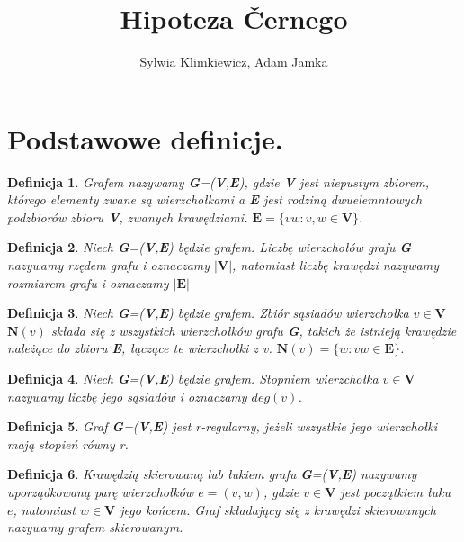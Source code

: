 \documentclass[12pt,a4paper]{article}
\newtheorem{df}{Definicja}[section]
\begin{document}
\title{Hipoteza \v Cernego}
\author{Sylwia Klimkiewicz, Adam Jamka}
\maketitle


\section{Podstawowe definicje.}
\begin{df} 
Grafem nazywamy \textbf{G}=(\textbf{V},\textbf{E}), gdzie \textbf{V} jest niepustym zbiorem, kt\'orego elementy zwane s\k{a} wierzcho{\l}kami a \textbf{E} jest rodzin\k{a} dwuelemntowych podzbior\'ow zbioru \textbf{V}, zwanych kraw\k{e}dziami.
$\textbf{E}=\{vw : v,w\in\textbf{V}\}$.
\end{df}
\begin{df} 
Niech \textbf{G}=(\textbf{V},\textbf{E}) b\k{e}dzie grafem. Liczb\k{e} wierzcho{\l}\'ow grafu \textbf{G} nazywamy rz\k{e}dem grafu i oznaczamy $|\textbf{V}|$, natomiast liczb\k{e} kraw\k{e}dzi nazywamy rozmiarem grafu i oznaczamy $|\textbf{E}|$
\end{df}
\begin{df} 
Niech \textbf{G}=(\textbf{V},\textbf{E}) b\k{e}dzie grafem. Zbi\'or s\k{a}siad\'ow wierzcho{\l}ka $v\in\textbf{V}$ $\textbf{N}(v)$ sk{\l}ada si\k{e} z wszystkich wierzcho{\l}k\'ow grafu \textbf{G}, takich \.ze istniej\k{a} kraw\k{e}dzie nale\.z\k{a}ce do zbioru \textbf{E}, {\l}\k{a}cz\k{a}ce te wierzcho{\l}ki z v. $\textbf{N}(v)=\{w : vw\in\textbf{E}\}$.
\end{df} 
\begin{df} 
Niech \textbf{G}=(\textbf{V},\textbf{E}) b\k{e}dzie grafem. Stopniem wierzcho{\l}ka $v\in\textbf{V}$ nazywamy liczb\k{e} jego s\k{a}siad\'ow i oznaczamy $deg(v)$.
\end{df}
\begin{df} 
Graf \textbf{G}=(\textbf{V},\textbf{E}) jest r-regularny, je\.zeli wszystkie jego wierzcho{\l}ki maj\k{a} stopie\'n r\'owny r.
\end{df} 
\begin{df} 
Kraw\k{e}dzi\k{a} skierowan\k{a} lub {\l}ukiem grafu \textbf{G}=(\textbf{V},\textbf{E}) nazywamy uporz\k{a}dkowan\k{a} par\k{e} wierzcho{\l}k\'ow $e=(v,w)$, gdzie $v\in\textbf{V}$ jest pocz\k{a}tkiem {\l}uku $e$, natomiast $w\in\textbf{V}$ jego ko\'ncem. Graf sk{\l}adaj\k{a}cy si\k{e} z kraw\k{e}dzi skierowanych nazywamy grafem skierowanym.
\end{df}
\end{document}
